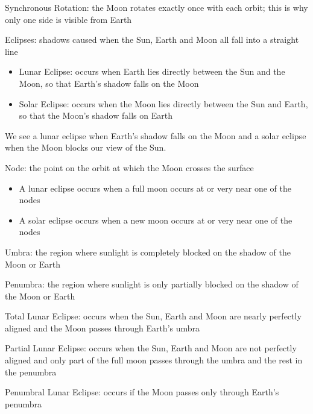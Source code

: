 \documentclass[12pt]{article}
\begin{document}
\begin{definition} Synchronous Rotation: the Moon rotates exactly once with each orbit; this is why only one side is visible from Earth \end{definition}
\begin{definition} Eclipses: shadows caused when the Sun, Earth and Moon all fall into a straight line \begin{itemize} 
\item Lunar Eclipse: occurs when Earth lies directly between the Sun and the Moon, so that Earth's shadow falls on the Moon 
\item Solar Eclipse: occurs when the Moon lies directly between the Sun and Earth, so that the Moon's shadow falls on Earth \end{itemize} \end{definition} 
We see a lunar eclipse when Earth's shadow falls on the Moon and a solar eclipse when the Moon blocks our view of the Sun. 
\begin{definition} Node: the point on the orbit at which the Moon crosses the surface \begin{itemize} 
\item A lunar eclipse occurs when a full moon occurs at or very near one of the nodes 
\item A solar eclipse occurs when a new moon occurs at or very near one of the nodes \end{itemize}\end{definition} 
\begin{definition} Umbra: the region where sunlight is completely blocked on the shadow of the Moon or Earth \end{definition} 
\begin{definition} Penumbra: the region where sunlight is only partially blocked on the shadow of the Moon or Earth \end{definition} 
\begin{definition} Total Lunar Eclipse: occurs when the Sun, Earth and Moon are nearly perfectly aligned and the Moon passes through Earth's umbra \end{definition} 
\begin{definition} Partial Lunar Eclipse: occurs when the Sun, Earth and Moon are not perfectly aligned and only part of the full moon passes through the umbra and the rest in the penumbra \end{definition} 
\begin{definition} Penumbral Lunar Eclipse: occurs if the Moon passes only through Earth's penumbra \end{definition} 
\end{document}
